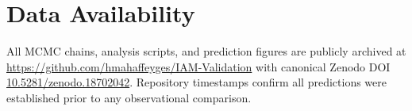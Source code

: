 \documentclass[12pt,a4paper]{article}
\begin{document}
\section*{Data Availability}

All MCMC chains, analysis scripts, and prediction figures are publicly
archived at \url{https://github.com/hmahaffeyges/IAM-Validation} with
canonical Zenodo DOI \href{https://doi.org/10.5281/zenodo.18702042}{10.5281/zenodo.18702042}.
Repository timestamps confirm all predictions were established prior to
any observational comparison.



\end{document}
